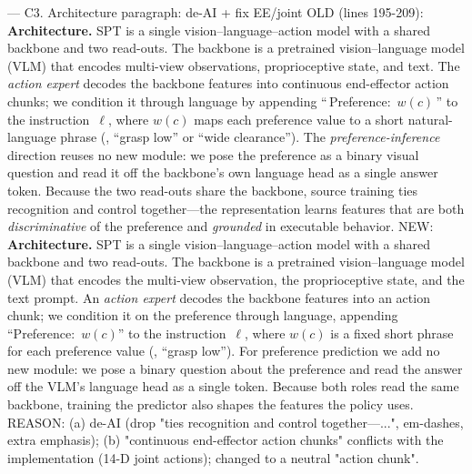 --- C3.  Architecture paragraph: de-AI + fix EE/joint
OLD (lines 195-209):
  \textbf{Architecture.}
  SPT is a single vision--language--action model with a shared backbone and two
  read-outs. The backbone is a pretrained vision--language model (VLM) that
  encodes multi-view observations, proprioceptive state, and text. The
  \emph{action expert} decodes the backbone features into continuous end-effector
  action chunks; we condition it through language by appending
  ``\,Preference:~$w(c)$\,'' to the instruction~$\ell$, where $w(c)$ maps each
  preference value to a short natural-language phrase
  (\eg{}, ``grasp low'' or ``wide clearance''). The \emph{preference-inference}
  direction reuses no new module: we pose the preference as a binary visual
  question and read it off the backbone's own language head as a single answer
  token. Because the two read-outs share the backbone, source training ties
  recognition and control together---the representation learns features that are
  both \emph{discriminative} of the preference and \emph{grounded} in executable
  behavior.
NEW:
  \textbf{Architecture.}
  SPT is a single vision--language--action model with a shared backbone and two
  read-outs. The backbone is a pretrained vision--language model (VLM) that
  encodes the multi-view observation, the proprioceptive state, and the text
  prompt. An \emph{action expert} decodes the backbone features into an action
  chunk; we condition it on the preference through language, appending
  ``Preference:~$w(c)$'' to the instruction~$\ell$, where $w(c)$ is a fixed short
  phrase for each preference value (\eg, ``grasp low''). For preference
  prediction we add no new module: we pose a binary question about the preference
  and read the answer off the VLM's language head as a single token. Because both
  roles read the same backbone, training the predictor also shapes the features
  the policy uses.
REASON: (a) de-AI (drop "ties recognition and control together---...",
  em-dashes, extra emphasis); (b) "continuous end-effector action chunks"
  conflicts with the implementation (14-D joint actions); changed to a neutral
  "action chunk".


